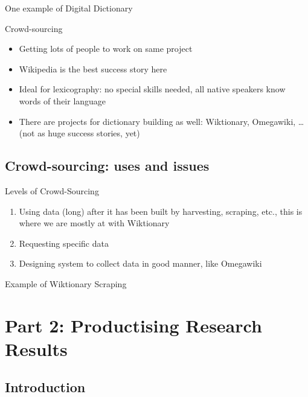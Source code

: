 \documentclass[t,12pt]{beamer}
\begin{document}
\begin{frame}{One example of Digital Dictionary}
    \texttt{}
\end{frame}

\begin{frame}{Crowd-sourcing}
    \begin{itemize}
        \item Getting lots of people to work on same project
        \item Wikipedia is the best success story here
        \item Ideal for lexicography: no special skills needed, all native
            speakers know words of their language
        \item There are projects for dictionary building as well:
            Wiktionary, Omegawiki, \ldots (not as huge success stories, yet)
    \end{itemize}
\end{frame}

\subsection{Crowd-sourcing: uses and issues}

\begin{frame}{Levels of Crowd-Sourcing}
    \begin{enumerate}
        \item Using data (long) after it has been built by harvesting, scraping,
            etc., this is where we are mostly at with Wiktionary
        \item Requesting specific data 
        \item Designing system to collect data in good manner, like Omegawiki
    \end{enumerate}
\end{frame}

\begin{frame}{Example of Wiktionary Scraping}

\end{frame}

\section{Part 2: Productising Research Results}

\subsection{Introduction}
\end{document}
